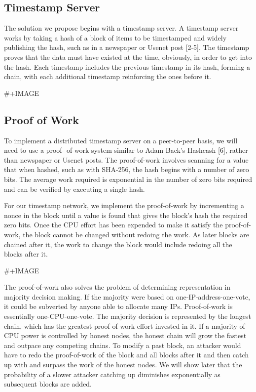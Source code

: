 \documentclass[11pt]{article}
\begin{document}
\subsection{Timestamp Server}
\label{sec:orgf7407bb}
The solution we propose begins with a timestamp server.
A timestamp server works by taking a hash of a block of items to be timestamped and widely publishing the hash, such as in a newspaper or Usenet post [2-5].
The timestamp proves that the data must have existed at the time, obviously, in order to get into the hash.
Each timestamp includes the previous timestamp in its hash, forming a chain, with each additional timestamp reinforcing the ones before it.

\#+IMAGE
\subsection{Proof of Work}
\label{sec:orgc9753ca}
To implement a distributed timestamp server on a peer-to-peer basis, we will need to use a proof- of-work system similar to Adam Back's Hashcash [6], rather than newspaper or Usenet posts.
The proof-of-work involves scanning for a value that when hashed, such as with SHA-256, the hash begins with a number of zero bits.
The average work required is exponential in the number of zero bits required and can be verified by executing a single hash.

For our timestamp network, we implement the proof-of-work by incrementing a nonce in the block until a value is found that gives the block's hash the required zero bits.
Once the CPU effort has been expended to make it satisfy the proof-of-work, the block cannot be changed without redoing the work.
As later blocks are chained after it, the work to change the block would include redoing all the blocks after it.

\#+IMAGE

The proof-of-work also solves the problem of determining representation in majority decision making.
If the majority were based on one-IP-address-one-vote, it could be subverted by anyone able to allocate many IPs.
Proof-of-work is essentially one-CPU-one-vote.
The majority decision is represented by the longest chain, which has the greatest proof-of-work effort invested in it.
If a majority of CPU power is controlled by honest nodes, the honest chain will grow the fastest and outpace any competing chains.
To modify a past block, an attacker would have to redo the proof-of-work of the block and all blocks after it and then catch up with and surpass the work of the honest nodes.
We will show later that the probability of a slower attacker catching up diminishes exponentially as subsequent blocks are added.
\end{document}
